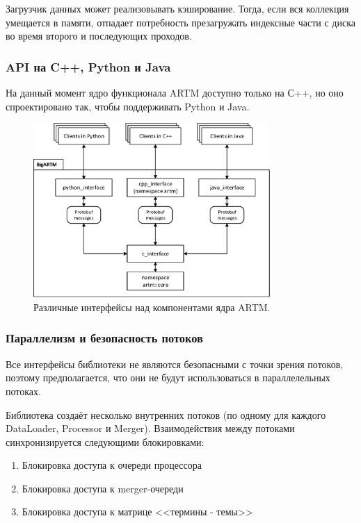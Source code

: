 \documentclass[12pt]{article}
\begin{document}
Загрузчик данных может реализовывать кэширование. Тогда, если вся коллекция умещается в памяти, отпадает потребность презагружать индексные части с диска во время второго и последующих проходов.

\subsubsection{API на C++, Python и Java}
На данный момент ядро функционала ARTM доступно только на С++, но оно спроектировано так, чтобы поддерживать Python и Java.

\begin{figure}[h!]
\begin{centering}
\includegraphics[width=90mm]{diagramm_BigARTM.eps}
\caption{Различные интерфейсы над компонентами ядра ARTM.}
\label{fig:diagramm_BigARTM}
\end{centering}
\end{figure}

\subsubsection{Параллелизм и безопасность потоков}

Все интерфейсы библиотеки не являются безопасными с точки зрения потоков, поэтому предполагается, что они не будут использоваться в параллелельных потоках.

Библиотека создаёт несколько внутренних потоков (по одному для каждого DataLoader, Processor и Merger). Взаимодействия между потоками синхронизируется следующими блокировками:

\begin{enumerate}
    \item Блокировка доступа к очереди процессора
    \item Блокировка доступа к merger-очереди
    \item Блокировка доступа к матрице <<термины - темы>>
\end{enumerate}
\end{document}
